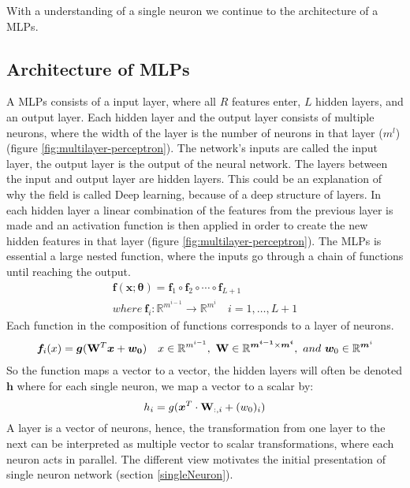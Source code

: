 With a understanding of a single neuron we continue to the architecture of a MLPs.


\subsection{Architecture of MLPs}\label{architectureMLPs}
A MLPs consists of a input layer, where all $R$ features enter, $L$ hidden layers, and an output layer. Each hidden layer and the output layer consists of multiple neurons, where the width of the layer is the number of neurons in that layer ($m^l$) (figure \ref{fig:multilayer-perceptron}). The network's inputs are called the input layer, the output layer is the output of the neural network. The layers between the input and output layer are hidden layers. This could be an explanation of why the field is called Deep learning, because of a deep structure of layers. In each hidden layer a linear combination of the features from the previous layer is made and an activation function is then applied in order to create the new hidden features in that layer (figure \ref{fig:multilayer-perceptron}). The MLPs is essential a large nested function, where the inputs go through a chain of functions until reaching the output.
\begin{align*}
\bm{f}(\bm{x};\bm{\theta})=\bm{f}_1 \circ \bm{f}_2 \circ \cdots \circ \bm{f}_{L+1}\\
where \ \bm{f}_i : \mathbb{R}^{m^{i-1}} \to \mathbb{R}^{m^{i}} \quad i=1,\ldots, L+1
\end{align*}
Each function in the composition of functions corresponds to a layer of neurons.
\begin{align*}
\bm{f}_i(x)=\bm{g}(\mathbf{W}^T \bm{x} + \bm{w_0}) \quad x\in \mathbb{R}^{m^{i-1}}, \ \mathbf{W} \in \mathbb{R}^{\bm{m^{i-1}} \times \bm{m^{i}} }, \ and \ \bm{w}_0 \in \mathbb{R}^{\bm{m}^{i}}
\end{align*}
So the function maps a vector to a vector, the hidden layers will often be denoted $\bm{h}$ where for each single neuron, we map a vector to a scalar by:
$$h_i=g(\bm{x}^T \cdot \mathbf{W}_{:,i} + (w_0)_{i})$$
A layer is a vector of neurons, hence, the transformation from one layer to the next can be interpreted as multiple vector to scalar transformations, where each neuron acts in parallel. The different view motivates the initial presentation of single neuron network (section \ref{singleNeuron}).


